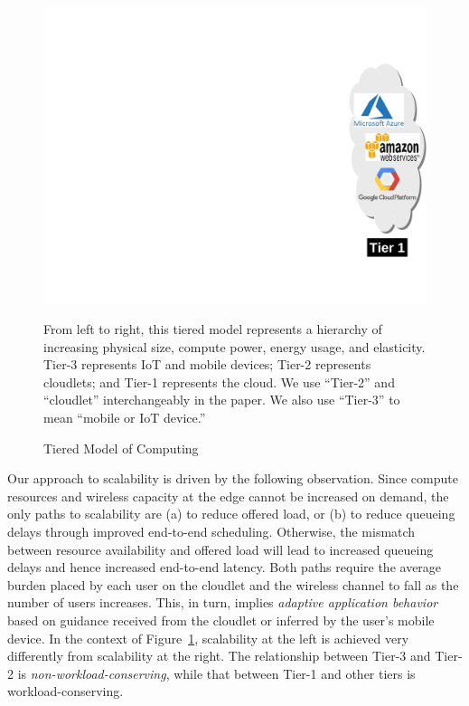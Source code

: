 \begin{figure}
\begin{minipage}[b]{4.3in}
\begin{minipage}[c]{0.55in}
\includegraphics[scale=0.33]{FIGS/fig-3tier-C.pdf}
\end{minipage}
\begin{captiontext}
  From left to right, this tiered model represents a hierarchy of
  increasing physical size, compute power, energy usage, and
  elasticity. Tier-3 represents IoT and mobile devices; Tier-2
  represents cloudlets; and Tier-1 represents the cloud.  We use
  ``Tier-2'' and ``cloudlet'' interchangeably in the paper.  We also
  use ``Tier-3'' to mean ``mobile or IoT device.''
\end{captiontext}
\vspace{-0.1in}
\caption{\small Tiered Model of Computing}
\label{fig:3tier}
\end{minipage}
\hspace*{0.1in}
\end{figure}

Our approach to scalability is driven by the following observation.
Since compute resources and wireless capacity at the edge cannot be
increased on demand, the only paths to scalability are (a) to reduce
offered load, or (b) to reduce queueing delays through improved
end-to-end scheduling.  Otherwise, the mismatch between resource
availability and offered load will lead to increased queueing delays
and hence increased end-to-end latency.  Both paths require the
average burden placed by each user on the cloudlet and the wireless
channel to fall as the number of users increases.  This, in turn,
implies {\em adaptive application behavior} based on guidance received
from the cloudlet or inferred by the user's mobile device.  In the
context of Figure~\ref{fig:3tier}, scalability at the left is achieved
very differently from scalability at the right.  The relationship
between Tier-3 and Tier-2 is {\em non-workload-conserving}, while that
between Tier-1 and other tiers is workload-conserving.

